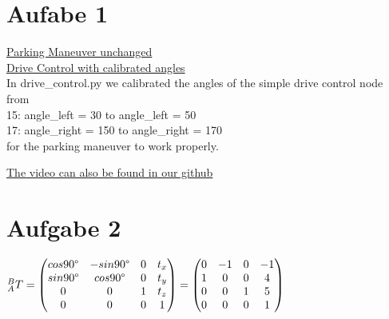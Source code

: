 \documentclass[10pt,oneside,a4paper]{article}
\begin{document}
  \section{Aufabe 1}
    \href{https://github.com/bigzed/model_car/blob/version-4.0/catkin_ws/src/simple_parking_maneuver/src/parking_maneuver.py}{Parking Maneuver unchanged} \\
    \href{https://github.com/bigzed/model_car/blob/version-4.0/catkin_ws/src/simple_drive_control/src/drive_control.py}{Drive Control with calibrated angles} \\
    In drive\_control.py we calibrated the angles of the simple drive control
    node from \\
    15: angle\_left = 30 to angle\_left = 50 \\
    17: angle\_right = 150 to angle\_right = 170 \\
    for the parking maneuver to work properly.

    \href{https://github.com/bigzed/model_car/blob/version-4.0/texinput/videos/movie.mp4}{The video can also be found in our github}
  \section{Aufgabe 2}
  $^{B}_{A} T = \begin{pmatrix}
      cos 90\degree & - sin 90\degree & 0 & t_{x} \\
        sin 90\degree & cos 90\degree & 0 & t_{y} \\
        0 & 0 & 1 & t_{z} \\
        0 & 0 & 0 & 1 \\
    \end{pmatrix} =
  \begin{pmatrix}
        0 & -1 & 0 & -1 \\
        1 & 0 & 0 & 4 \\
        0 & 0 & 1 & 5 \\
        0 & 0 & 0 & 1 \\
    \end{pmatrix}$
\end{document}
